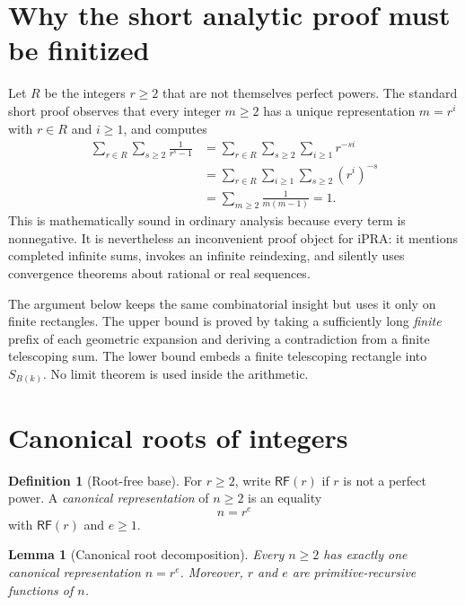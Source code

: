 \documentclass[11pt]{article}
\newtheorem{lemma}[theorem]{Lemma}
\theoremstyle{definition}
\newtheorem{definition}[theorem]{Definition}
\newcommand{\RF}{\mathsf{RF}}
\begin{document}
\section{Why the short analytic proof must be finitized}

Let $R$ be the integers $r\ge2$ that are not themselves perfect powers.  The
standard short proof observes that every integer $m\ge2$ has a unique
representation $m=r^i$ with $r\in R$ and $i\ge1$, and computes
\[
\begin{aligned}
 \sum_{r\in R}\sum_{s\ge2}\frac1{r^s-1}
 &=\sum_{r\in R}\sum_{s\ge2}\sum_{i\ge1}r^{-si}\\
 &=\sum_{r\in R}\sum_{i\ge1}\sum_{s\ge2}(r^i)^{-s}\\
 &=\sum_{m\ge2}\frac1{m(m-1)}=1.
\end{aligned}
\]
This is mathematically sound in ordinary analysis because every term is
nonnegative.  It is nevertheless an inconvenient proof object for iPRA: it
mentions completed infinite sums, invokes an infinite reindexing, and silently
uses convergence theorems about rational or real sequences.

The argument below keeps the same combinatorial insight but uses it only on
finite rectangles.  The upper bound is proved by taking a sufficiently long
\emph{finite} prefix of each geometric expansion and deriving a contradiction
from a finite telescoping sum.  The lower bound embeds a finite telescoping
rectangle into $S_{B(k)}$.  No limit theorem is used inside the arithmetic.

\section{Canonical roots of integers}

\begin{definition}[Root-free base]\label{def:rootfree}
For $r\ge2$, write $\RF(r)$ if $r$ is not a perfect power.  A
\emph{canonical representation} of $n\ge2$ is an equality
\[
  n=r^e
\]
with $\RF(r)$ and $e\ge1$.
\end{definition}

\begin{lemma}[Canonical root decomposition]\label{lem:canonical}
Every $n\ge2$ has exactly one canonical representation $n=r^e$.
Moreover, $r$ and $e$ are primitive-recursive functions of $n$.
\end{lemma}
\end{document}
